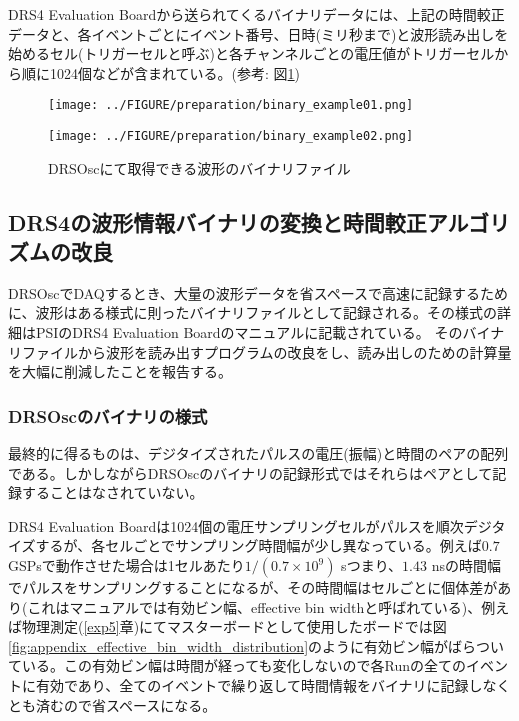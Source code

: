 \documentclass[../../main.tex]{subfiles}
\numberwithin{equation}{section}
\numberwithin{table}{section}
\numberwithin{figure}{section}
\begin{document}
  DRS4 Evaluation Boardから送られてくるバイナリデータには、上記の時間較正データと、各イベントごとにイベント番号、日時(ミリ秒まで)と波形読み出しを始めるセル(トリガーセルと呼ぶ)と各チャンネルごとの電圧値がトリガーセルから順に1024個などが含まれている。(参考: 図\ref{fig:preparation_binary_example})

  \begin{figure}[H]
    \begin{minipage}[b]{0.48\columnwidth}
      \centering
      \texttt{[image: ../FIGURE/preparation/binary\_example01.png]}
      \label{fig:preparation_binary01}
    \end{minipage}
    \hspace{0.04\columnwidth} %
    \begin{minipage}[b]{0.48\columnwidth}
      \centering
      \texttt{[image: ../FIGURE/preparation/binary\_example02.png]}
      \label{fig:preparation_binary02}
    \end{minipage}
    \caption{DRSOscにて取得できる波形のバイナリファイル\cite{preparation:DRS4_manual}}\label{fig:preparation_binary_example}
  \end{figure}


  \FloatBarrier
  \subsection{DRS4の波形情報バイナリの変換と時間較正アルゴリズムの改良}
    DRSOscでDAQするとき、大量の波形データを省スペースで高速に記録するために、波形はある様式に則ったバイナリファイルとして記録される。その様式の詳細はPSIのDRS4 Evaluation Boardのマニュアル\cite{preparation:DRS4_manual}に記載されている。 そのバイナリファイルから波形を読み出すプログラムの改良をし、読み出しのための計算量を大幅に削減したことを報告する。

    \subsubsection{DRSOscのバイナリの様式}
      最終的に得るものは、デジタイズされたパルスの電圧(振幅)と時間のペアの配列である。しかしながらDRSOscのバイナリの記録形式ではそれらはペアとして記録することはなされていない。
      
      DRS4 Evaluation Boardは1024個の電圧サンプリングセルがパルスを順次デジタイズするが、各セルごとでサンプリング時間幅が少し異なっている。例えば$0.7$ GSPsで動作させた場合は1セルあたり$1/(0.7\times10^9)$ \si{\second}つまり、$1.43$ \si{\nano\second}の時間幅でパルスをサンプリングすることになるが、その時間幅はセルごとに個体差があり(これはマニュアルでは有効ビン幅、effective bin widthと呼ばれている)、例えば物理測定(\ref{exp5}章)にてマスターボードとして使用したボードでは図\ref{fig:appendix_effective_bin_width_distribution}のように有効ビン幅がばらついている。この有効ビン幅は時間が経っても変化しないので各Runの全てのイベントに有効であり、全てのイベントで繰り返して時間情報をバイナリに記録しなくとも済むので省スペースになる。
      
\end{document}

